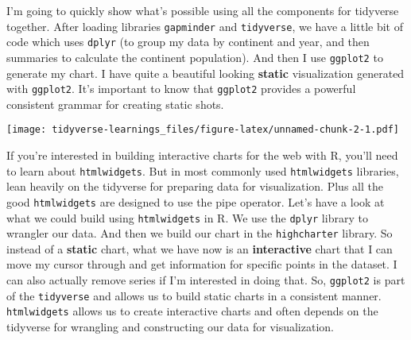 \documentclass[
]{article}
\newenvironment{Shaded}{\begin{snugshade}}{\end{snugshade}}
\newcommand{\AttributeTok}[1]{\textcolor[rgb]{0.77,0.63,0.00}{#1}}
\newcommand{\FunctionTok}[1]{\textcolor[rgb]{0.00,0.00,0.00}{#1}}
\newcommand{\NormalTok}[1]{#1}
\newcommand{\SpecialCharTok}[1]{\textcolor[rgb]{0.00,0.00,0.00}{#1}}
\newcommand{\StringTok}[1]{\textcolor[rgb]{0.31,0.60,0.02}{#1}}
\begin{document}
I'm going to quickly show what's possible using all the components for tidyverse together. After loading libraries \texttt{gapminder} and \texttt{tidyverse}, we have a little bit of code which uses \texttt{dplyr} (to group my data by continent and year, and then summaries to calculate the continent population). And then I use \texttt{ggplot2} to generate my chart. I have quite a beautiful looking \textbf{static} visualization generated with \texttt{ggplot2}. It's important to know that \texttt{ggplot2} provides a powerful consistent grammar for creating static shots.

\begin{Shaded}
\end{Shaded}

\texttt{[image: tidyverse-learnings\_files/figure-latex/unnamed-chunk-2-1.pdf]}

If you're interested in building interactive charts for the web with R, you'll need to learn about \texttt{htmlwidgets}. But in most commonly used \texttt{htmlwidgets} libraries, lean heavily on the tidyverse for preparing data for visualization. Plus all the good \texttt{htmlwidgets} are designed to use the pipe operator. Let's have a look at what we could build using \texttt{htmlwidgets} in R. We use the \texttt{dplyr} library to wrangler our data. And then we build our chart in the \texttt{highcharter} library. So instead of a \textbf{static} chart, what we have now is an \textbf{interactive} chart that I can move my cursor through and get information for specific points in the dataset. I can also actually remove series if I'm interested in doing that. So, \texttt{ggplot2} is part of the \texttt{tidyverse} and allows us to build static charts in a consistent manner. \texttt{htmlwidgets} allows us to create interactive charts and often depends on the tidyverse for wrangling and constructing our data for visualization.
\end{document}
